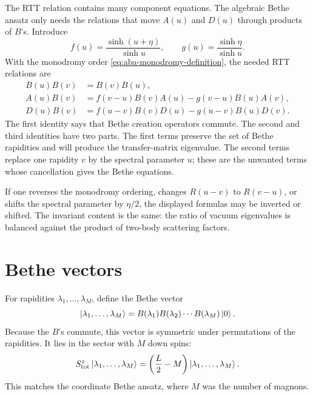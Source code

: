 The RTT relation contains many component equations.  The algebraic Bethe ansatz
only needs the relations that move $A(u)$ and $D(u)$ through products of $B$'s.
Introduce
\begin{equation}
\label{eq:aba-f-and-g-functions}
    f(u)=\frac{\sinh(u+\eta)}{\sinh u},
    \qquad
    g(u)=\frac{\sinh\eta}{\sinh u} .
\end{equation}
With the monodromy order \cref{eq:aba-monodromy-definition}, the needed RTT
relations are
\begin{align}
\label{eq:aba-BB-commutation}
    B(u)B(v)&=B(v)B(u),\\
\label{eq:aba-AB-commutation}
    A(u)B(v)
    &=
    f(v-u)B(v)A(u)-g(v-u)B(u)A(v),\\
\label{eq:aba-DB-commutation}
    D(u)B(v)
    &=
    f(u-v)B(v)D(u)-g(u-v)B(u)D(v).
\end{align}
The first identity says that Bethe creation operators commute.  The second and
third identities have two parts.  The first terms preserve the set of Bethe
rapidities and will produce the transfer-matrix eigenvalue.  The second terms
replace one rapidity $v$ by the spectral parameter $u$; these are the unwanted
terms whose cancellation gives the Bethe equations.

\begin{remark}
If one reverses the monodromy ordering, changes $R(u-v)$ to $R(v-u)$, or shifts
the spectral parameter by $\eta/2$, the displayed formulas may be inverted or
shifted.  The invariant content is the same: the ratio of vacuum eigenvalues is
balanced against the product of two-body scattering factors.
\end{remark}

\section{Bethe vectors}
\label{sec:aba-bethe-vectors}

For rapidities $\lambda_1,
\ldots,\lambda_M$, define the Bethe vector
\begin{equation}
\label{eq:aba-bethe-vector}
    \left|\lambda_1,\ldots,\lambda_M\right\rangle
    =
    B(\lambda_1)B(\lambda_2)\cdots B(\lambda_M)\left|0\right\rangle .
\end{equation}
Because the $B$'s commute, this vector is symmetric under permutations of the
rapidities.  It lies in the sector with $M$ down spins:
\begin{equation}
\label{eq:aba-magnetization-sector}
    S^z_{\rm tot}\left|\lambda_1,\ldots,\lambda_M\right\rangle
    =
    \left(\frac{L}{2}-M\right)
    \left|\lambda_1,\ldots,\lambda_M\right\rangle .
\end{equation}
This matches the coordinate Bethe ansatz, where $M$ was the number of magnons.

